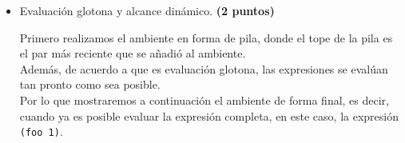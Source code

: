 \documentclass[11pt]{article}
\begin{document}
\begin{enumerate}[leftmargin=0.8cm]
\begin{itemize}
        \item Evaluación glotona y alcance dinámico. \textbf{(2 puntos)}

        Primero realizamos el ambiente en forma de pila, donde el tope de la pila es el par más reciente que se añadió al ambiente.\\
        Además, de acuerdo a que es evaluación glotona, las expresiones se evalúan tan pronto como sea posible.\\
        Por lo que mostraremos a continuación el ambiente de forma final, es decir, cuando ya es posible evaluar la expresión completa, en este caso, la expresión \texttt{(foo 1)}.\\
        \begin{center}

        \end{center}


\end{itemize}
\end{enumerate}
\end{document}
